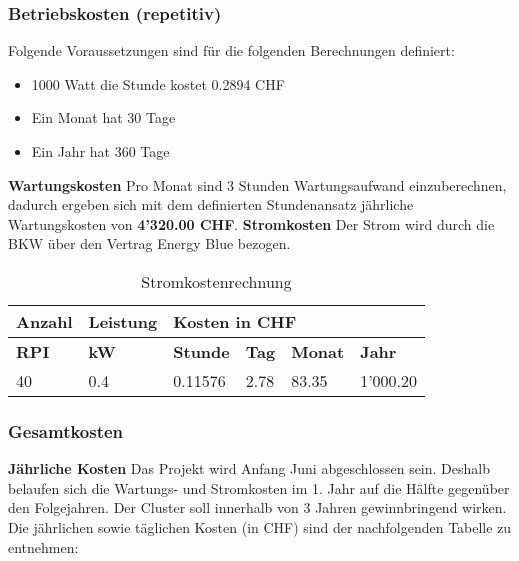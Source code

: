 \subsubsection{Betriebskosten (repetitiv)}

Folgende Voraussetzungen sind für die folgenden Berechnungen definiert:
\begin{itemize}
	\item 1000 Watt die Stunde kostet 0.2894 CHF
	\item Ein Monat hat 30 Tage
	\item Ein Jahr hat 360 Tage
\end{itemize}

\textbf{Wartungskosten}
\newline
Pro Monat sind 3 Stunden Wartungsaufwand einzuberechnen, dadurch ergeben sich mit dem definierten Stundenansatz jährliche Wartungskosten von \textbf{4'320.00 CHF}. \newline
\newline
\textbf{Stromkosten}
Der Strom wird durch die BKW über den Vertrag Energy Blue bezogen.

\begin{table}[H]
\centering
\begin{tabular}{p{1.5cm}p{2cm}|p{2.75cm}p{2.75cm}p{2.75cm}p{2.75cm}}
\hline
\rowcolor{heading} \textbf{Anzahl} & \textbf{Leistung} & \multicolumn{4}{l}{\textbf{Kosten in CHF}} \\\hline
\rowcolor{subheading} \textbf{RPI} & \textbf{kW} & \textbf{Stunde} &\textbf{Tag} & \textbf{Monat} &\textbf{Jahr} \\\hline
40 & 0.4 & 0.11576 & 2.78 & 83.35 & 1'000.20 \\\hline
\end{tabular}
\caption{Stromkostenrechnung}
\end{table}

\subsubsection{Gesamtkosten}

\textbf{Jährliche Kosten} \newline
Das Projekt wird Anfang Juni abgeschlossen sein. Deshalb belaufen sich die Wartungs- und Stromkosten im 1. Jahr auf die Hälfte gegenüber den Folgejahren.
Der Cluster soll innerhalb von 3 Jahren gewinnbringend wirken. Die jährlichen sowie täglichen Kosten (in CHF) sind der nachfolgenden Tabelle zu entnehmen: 

